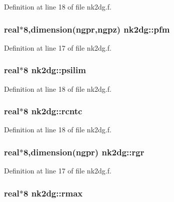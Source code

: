 Definition at line 18 of file nk2dg.f.\hypertarget{namespacenk2dg_733992eb6e80ce656c32d6d353c4677b}{
\subsubsection[pfm]{\setlength{\rightskip}{0pt plus 5cm}real$\ast$8,dimension(ngpr,ngpz) {\bf nk2dg::pfm}}}
\label{namespacenk2dg_733992eb6e80ce656c32d6d353c4677b}




Definition at line 17 of file nk2dg.f.\hypertarget{namespacenk2dg_af4c53f2a1030fd743abb4a613562faa}{
\subsubsection[psilim]{\setlength{\rightskip}{0pt plus 5cm}real$\ast$8 {\bf nk2dg::psilim}}}
\label{namespacenk2dg_af4c53f2a1030fd743abb4a613562faa}




Definition at line 18 of file nk2dg.f.\hypertarget{namespacenk2dg_b8da20bfe7c672322e034214f4902319}{
\subsubsection[rcntc]{\setlength{\rightskip}{0pt plus 5cm}real$\ast$8 {\bf nk2dg::rcntc}}}
\label{namespacenk2dg_b8da20bfe7c672322e034214f4902319}




Definition at line 18 of file nk2dg.f.\hypertarget{namespacenk2dg_cf5c5ade5f9197d1f9a6a9730e570159}{
\subsubsection[rgr]{\setlength{\rightskip}{0pt plus 5cm}real$\ast$8,dimension(ngpr) {\bf nk2dg::rgr}}}
\label{namespacenk2dg_cf5c5ade5f9197d1f9a6a9730e570159}




Definition at line 17 of file nk2dg.f.\hypertarget{namespacenk2dg_72fec23caa6a548271a5e18c11a1dce9}{
\subsubsection[rmax]{\setlength{\rightskip}{0pt plus 5cm}real$\ast$8 {\bf nk2dg::rmax}}}
\label{namespacenk2dg_72fec23caa6a548271a5e18c11a1dce9}




